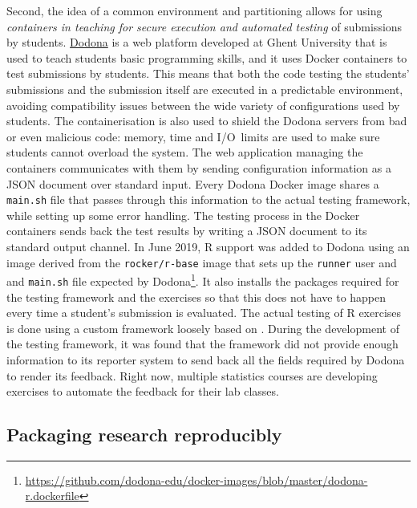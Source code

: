Second, the idea of a common environment and partitioning allows for
using \emph{containers in teaching for secure execution and automated
testing} of submissions by students.
\href{https://dodona.ugent.be}{Dodona} is a web platform developed at
Ghent University that is used to teach students basic programming
skills, and it uses Docker containers to test submissions by students.
This means that both the code testing the students' submissions and the
submission itself are executed in a predictable environment, avoiding
compatibility issues between the wide variety of configurations used by
students. The containerisation is also used to shield the Dodona servers
from bad or even malicious code: memory, time and I/O~limits are used to
make sure students cannot overload the system. The web application
managing the containers communicates with them by sending configuration
information as a JSON document over standard input. Every Dodona Docker
image shares a \texttt{main.sh} file that passes through this
information to the actual testing framework, while setting up some error
handling. The testing process in the Docker containers sends back the
test results by writing a JSON document to its standard output channel.
In June 2019, R support was added to Dodona using an image derived from
the \texttt{rocker/r-base} image that sets up the \texttt{runner} user
and and \texttt{main.sh} file expected by
Dodona\footnote{\href{https://github.com/dodona-edu/docker-images/blob/master/dodona-r.dockerfile}{https://github.com/dodona-edu/docker-images/blob/master/dodona-r.dockerfile}}.
It also installs the packages required for the testing framework and the
exercises so that this does not have to happen every time a student's
submission is evaluated. The actual testing of R exercises is done using
a custom framework loosely based on 
\citep{wickham_testthat_2011}. During the development of the testing
framework, it was found that the  framework did not
provide enough information to its reporter system to send back all the
fields required by Dodona to render its feedback. Right now, multiple
statistics courses are developing exercises to automate the feedback for
their lab classes.

\hypertarget{packaging-research-reproducibly}{%
\subsection{Packaging research
reproducibly}\label{packaging-research-reproducibly}}

